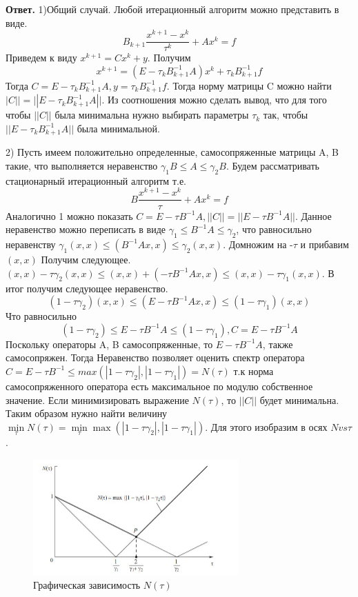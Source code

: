\documentclass{article}
\begin{document}
\begin{enumerate}
        {\bfseries Ответ. }
        1)Общий случай. Любой итерационный алгоритм можно представить в виде.
	\[
	B_{k+1} \frac{x^{k+1}-x^k}{\tau ^k}+Ax^k=f
	\]
	Приведем к виду $x^{k+1} = Cx^k +y$. Получим
	\[
	x^{k+1} = (E - \tau_k B_{k+1}^{-1}A)x^k + \tau_k B_{k+1}^{-1}f
	\]
	Тогда $C = E - \tau_k B_{k+1}^{-1}A, y =\tau_k B_{k+1}^{-1}f$. Тогда норму матрицы C можно найти $|C|| = ||E - \tau_k B_{k+1}^{-1}A||$. Из соотношения можно сделать вывод, что для того чтобы $||C||$ была минимальна нужно выбирать параметры $\tau_k$ так, чтобы $||E - \tau_k B_{k+1}^{-1}A||$ была минимальной.
	
	2) Пусть имеем положительно определенные, самосопряженные матрицы A, B такие, что выполняется неравенство $\gamma_1 B\le A \le \gamma_2 B$. Будем рассматривать стационарный итерационный алгоритм т.е.
	\[
	B\frac{x^{k+1}-x^k}{\tau}+Ax^k=f
	\]
	Аналогично 1 можно показать $C = E - \tau B^{-1}A, ||C|| = ||E - \tau B^{-1}A||$. Данное неравенство можно переписать в виде  $\gamma_1 \le B^{-1}A \le \gamma_2$, что равносильно неравенству $\gamma_1 (x,x) \le (B^{-1}Ax,x) \le \gamma_2 (x,x)$. Домножим на -$\tau$ и прибавим $(x,x)$ Получим следующее. $(x,x)-\tau \gamma_2 (x,x) \le (x,x) + (-\tau B^{-1}Ax,x) \le (x,x)-\tau \gamma_1 (x,x)$. В итог получим следующее неравенство.
	\[
	(1-\tau \gamma_2) (x,x) \le (E-\tau B^{-1}Ax,x) \le (1-\tau \gamma_1) (x,x)
	\]
	Что равносильно
	\[
	(1-\tau \gamma_2) \le E-\tau B^{-1}A \le (1-\tau \gamma_1), C =E-\tau B^{-1}A 
	\]
	Поскольку операторы A, B самосопряженные, то $E-\tau B^{-1}A$, также самосопряжен. Тогда Неравенство позволяет оценить спектр оператора $C=E-\tau B^{-1} \le max(|1-\tau \gamma_2|, |1-\tau \gamma_1|) = N(\tau)$ т.к норма самосопряженного оператора есть максимальное по модулю собственное значение. Если минимизировать выражение $N(\tau)$, то $||C||$ будет минимальна. Таким образом нужно найти величину $\min \limits _{\tau} N(\tau) = \min \limits_{\tau} \max(|1-\tau \gamma_2|, |1-\tau \gamma_1|)$. Для этого изобразим в осях $N vs \tau$.
	
	\begin{figure}[H]
        \center
        \includegraphics[width=0.7\textwidth]{vopros2.jpg}
        \caption{Графическая зависимость $N(\tau)$}
        \label{vopros2}
    \end{figure}


\end{enumerate}
\end{document}
